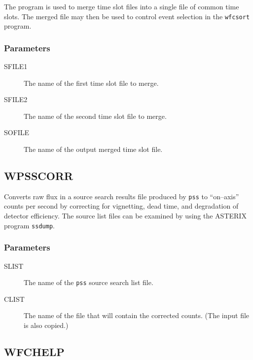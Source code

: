 The program is used to merge time slot files into a single file of common
time slots. The merged file may then be used to control event selection in 
the {\tt wfcsort} program.

\subsubsection{Parameters}

\begin{description}

\item[SFILE1]
The name of the first time slot file to merge.

\item[SFILE2]
The name of the second time slot file to merge.

\item[SOFILE]
The name of the output merged time slot file.

\end{description}

\subsection{WPSSCORR}
\label{sec:programs:wpsscorr}

Converts raw flux in a source search results file produced by {\tt pss} to 
``on--axis'' counts per second by correcting for vignetting, dead time,
and degradation of detector efficiency.  The source list files can be
examined by using the ASTERIX program {\tt ssdump}.

\subsubsection{Parameters}

\begin{description}

\item[SLIST]
The name of the {\tt pss} source search list file.

\item[CLIST]
The name of the file that will contain the corrected counts.  (The input
file is also copied.)

\end{description}

\subsection{WFCHELP}
\label{sec:programs:wfchelp}

